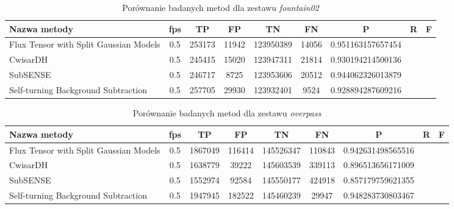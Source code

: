 \begin{table}[t]
\caption{Porównanie badanych metod dla zestawu \textit{fountain02}}
\label{tab:resultsFountain02}
\centering
\begin{tabular}{|l*{6}{|c}|}
  \hline 
  \textbf{Nazwa metody} & \textbf{fps} & \textbf{TP} & \textbf{FP} & \textbf{TN} & \textbf{FN} & \textbf{P} & \textbf{R} & \textbf{F}\\
  \hline
  Flux Tensor with Split Gaussian Models & 0.5 & 253173 & 11942 & 123950389 & 14056 & 0.951163157657454\\
  \hline
  CwisarDH & 0.5 & 245415 & 15020 & 123947311 & 21814 & 0.930194214500136\\
  \hline
  SubSENSE & 0.5 & 246717 & 8725 & 123953606 & 20512 & 0.944062326013879\\
  \hline
  Self-turning Background Subtraction & 0.5 & 257705 & 29930 & 123932401 & 9524 & 0.928894287609216\\
  \hline
\end{tabular}
\end{table}\begin{table}[t]
\caption{Porównanie badanych metod dla zestawu \textit{overpass}}
\label{tab:resultsOverpass}
\centering
\begin{tabular}{|l*{6}{|c}|}
  \hline 
  \textbf{Nazwa metody} & \textbf{fps} & \textbf{TP} & \textbf{FP} & \textbf{TN} & \textbf{FN} & \textbf{P} & \textbf{R} & \textbf{F}\\
  \hline
  Flux Tensor with Split Gaussian Models & 0.5 & 1867049 & 116414 & 145526347 & 110843 & 0.942631498565516\\
  \hline
  CwisarDH & 0.5 & 1638779 & 39222 & 145603539 & 339113 & 0.896513656171009\\
  \hline
  SubSENSE & 0.5 & 1552974 & 92584 & 145550177 & 424918 & 0.857179759621355\\
  \hline
  Self-turning Background Subtraction & 0.5 & 1947945 & 182522 & 145460239 & 29947 & 0.948283730803467\\
  \hline
\end{tabular}
\end{table}